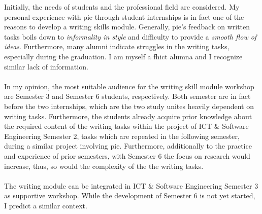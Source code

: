 Initially, the needs of students and the professional field are considered. My personal experience with \acrfull{pie} through student internships is in fact one of the reasons to develop a writing skills module. Generally, \acrshort{pie}'s feedback on written tasks boils down to \textit{informality in style }and difficulty to provide a \textit{smooth flow of ideas}. Furthermore, many alumni indicate struggles in the writing tasks, especially during the graduation. I am myself a \acrshort{fhict} alumna and I recognize similar lack of information.
\\\\
In my opinion, the most suitable audience for the writing skill module workshop are Semester 3 and Semester 6 students, respectively.
Both semester are in fact before the two internships, which are the two study unites heavily dependent on writing tasks. Furthermore, the students already acquire prior knowledge about the required content of the writing tasks within the project of ICT \& Software Engineering Semester 2, tasks which are repeated in the following semester, during a similar project involving \acrshort{pie}. Furthermore, additionally to the practice and experience of prior semesters, with Semester 6 the focus on research would increase, thus, so would the complexity of the the writing tasks.
\\\\
The writing module can be integrated in ICT \& Software Engineering Semester 3 as supportive workshop. While the development of Semester 6 is not yet started, I predict a similar context.
